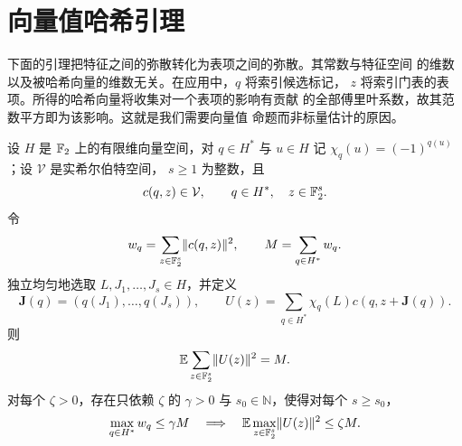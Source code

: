 \section{向量值哈希引理}\label{sec:hashing}

下面的引理把特征之间的弥散转化为表项之间的弥散。其常数与特征空间
的维数以及被哈希向量的维数无关。在应用中，$q$ 将索引候选标记，
$z$ 将索引门表的表项。所得的哈希向量将收集对一个表项的影响有贡献
的全部傅里叶系数，故其范数平方即为该影响。这就是我们需要向量值
命题而非标量估计的原因。

\begin{lemma}[向量值哈希]\label{lem:hashing}
设 $H$ 是 $\mathbb F_2$ 上的有限维向量空间，对 $q\in H^*$ 与 $u\in H$ 记
$\chi_q(u)=(-1)^{q(u)}$；设 $\mathcal V$ 是实希尔伯特空间，
$s\ge1$ 为整数，且
\[
 c(q,z)\in\mathcal V,
 \qquad q\in H^*,\quad z\in\mathbb F_2^s.
\]
令
\[
 w_q=\sum_{z\in\mathbb F_2^s}\lVert c(q,z)\rVert^2,
 \qquad M=\sum_{q\in H^*}w_q.
\]
独立均匀地选取 $L,J_1,\ldots,J_s\in H$，并定义
\[
 \mathbf J(q)=(q(J_1),\ldots,q(J_s)),
 \qquad
 U(z)=\sum_{q\in H^*}\chi_q(L)c(q,z+\mathbf J(q)).
\]
则
\begin{equation}\label{eq:hashing-total-mass}
 \mathbb E\sum_{z\in\mathbb F_2^s}\lVert U(z)\rVert^2=M.
\end{equation}
对每个 $\zeta>0$，存在只依赖 $\zeta$ 的 $\gamma>0$ 与
$s_0\in\mathbb N$，使得对每个 $s\ge s_0$，
\begin{equation}\label{eq:hashing-dispersion}
 \max_{q\in H^*}w_q\le\gamma M
 \quad\Longrightarrow\quad
 \mathbb E\max_{z\in\mathbb F_2^s}\lVert U(z)\rVert^2\le\zeta M.
\end{equation}
\end{lemma}

